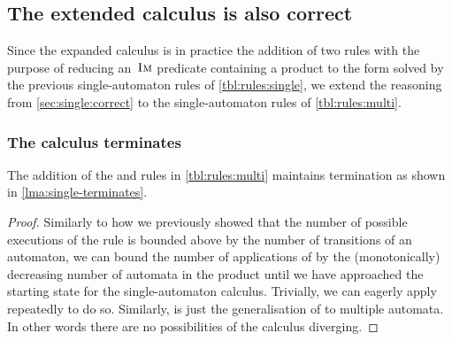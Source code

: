 \documentclass[acmsmall,review,anonymous,screen]{acmart}\settopmatter{printfolios=true,printccs=true,printacmref=true}
\theoremstyle{definition}
\begin{document}
\subsection{The extended calculus is also correct}

Since the expanded calculus is in practice the addition of two rules with the
purpose of reducing an~$\operatorname{\textsc{Im}}$ predicate containing a product to the form
solved by the previous single-automaton rules of \cref{tbl:rules:single}, we
extend the reasoning from \cref{sec:single:correct} to the single-automaton
rules of \cref{tbl:rules:multi}.

\subsubsection{The calculus terminates}
\begin{lemma}
  The addition of the \ExpandM{} and \Materialise{} rules in \cref{tbl:rules:multi}
  maintains termination as shown in \cref{lma:single-terminates}.
\end{lemma}
\begin{proof}
  Similarly to how we previously showed that the number of possible executions
  of the \Split{} rule is bounded above by the number of transitions of an
  automaton, we can bound the number of applications of \Materialise{} by the
  (monotonically) decreasing number of automata in the product until we have
  approached the starting state for the single-automaton calculus. Trivially, we
  can eagerly apply \Materialise{} repeatedly to do so. Similarly, \ExpandM{} is
  just the generalisation of \Expand{} to multiple automata. In other words there are no possibilities of the calculus diverging.
\end{proof}
\end{document}
